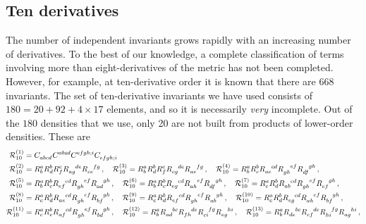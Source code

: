 \documentclass[11pt]{article}
\begin{document}
{\subsection{Ten derivatives}
The number of independent invariants grows rapidly with an increasing number of derivatives.
To the best of our knowledge, a complete classification of terms involving more than eight-derivatives of the metric has not been completed. However, for example, at ten-derivative order it is known that there are 668 invariants. The set of ten-derivative invariants we have used consists of $180 = 20 + 92 + 4\times 17$ elements, and so it is necessarily \textit{very} incomplete. Out of the $180$ densities that we use, only 20 are not built from products of lower-order densities. These are 
\begin{align}
\nonumber
\mathcal{R}_{10}^{(1)} &= \tensor{C}{_{abcd}} \tensor{C}{^{abcd}}  \tensor{C}{^{efgh;i}} \tensor{C}{_{efgh;i}}\, 
\nonumber\\
\mathcal{R}_{10}^{(2)} &= R_b^a R_d^b R_f^c \tensor{R}{_{ag}^{de}} \tensor{R}{_{ce}^{fg}} \, ,
\quad
\mathcal{R}_{10}^{(3)}  = R_b^a R_d^b R_f^c \tensor{R}{_{cg}^{de}} \tensor{R}{_{ae}^{fg}} \, ,
\quad 
\mathcal{R}_{10}^{(4)}  = R_b^a R_c ^b \tensor{R}{_{ae}^{cd}} \tensor{R}{_{gh}^{ef}} \tensor{R}{_{df}^{gh}} \, ,
\nonumber
\\
\mathcal{R}_{10}^{(5)} &= R_b^a R_c^b \tensor{R}{_{ef}^{cd}} \tensor{R}{_{gh}^{ef}} \tensor{R}{_{ad}^{gh}} \, ,
\quad
\mathcal{R}_{10}^{(6)} = R_b^a R_c^b \tensor{R}{_{eg}^{cd}} \tensor{R}{_{ah}^{ef}} \tensor{R}{_{df}^{gh}} \, ,
\quad
\mathcal{R}_{10}^{(7)} = R_c^a R_d^b \tensor{R}{_{ab}^{cd}}\tensor{R}{_{gh}^{ef}}\tensor{R}{_{ef}^{gh}} \, ,
\nonumber\\
\mathcal{R}_{10}^{(8)} &= R_c^a R_d^b \tensor{R}{_{ae}^{cd}}\tensor{R}{_{gh}^{ef}}\tensor{R}{_{bf}^{gh}} \, ,
\quad 
\mathcal{R}_{10}^{(9)} = R_c^a R_d ^b \tensor{R}{_{ef}^{cd}}\tensor{R}{_{gh}^{ef}} \tensor{R}{_{ab}^{gh}} \, ,
\quad 
\mathcal{R}_{10}^{(10)} = R_c^a R_d^b \tensor{R}{_{eg}^{cd}} \tensor{R}{_{ah}^{ef}} \tensor{R}{_{bf}^{gh}} \, ,
\nonumber\\
\mathcal{R}_{10}^{(11)} &= R_c^a R_e^b \tensor{R}{_{af}^{cd}} \tensor{R}{_{gh}^{ef}} \tensor{R}{_{bd}^{gh}} \, ,
\quad
\mathcal{R}_{10}^{(12)} = R_b^a \tensor{R}{_{ad}^{bc}} \tensor{R}{_{fh}^{de}}\tensor{R}{_{c i}^{fg}} \tensor{R}{_{eg}^{hi}} \, ,
\quad
\mathcal{R}_{10}^{(13)} = R_b^a \tensor{R}{_{de}^{bc}}\tensor{R}{_{cf}^{de}} \tensor{R}{_{hi}^{fg}} \tensor{R}{_{ag}^{hi}} \, ,
\nonumber\\

\end{align}}
\end{document}
